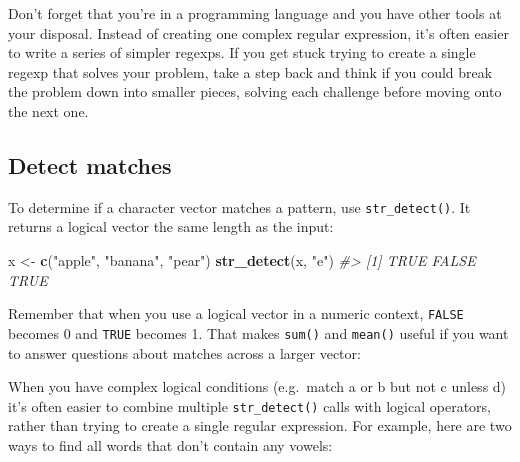 \documentclass[]{book}
\newenvironment{Shaded}{\begin{snugshade}}{\end{snugshade}}
\newcommand{\KeywordTok}[1]{\textcolor[rgb]{0.13,0.29,0.53}{\textbf{{#1}}}}
\newcommand{\StringTok}[1]{\textcolor[rgb]{0.31,0.60,0.02}{{#1}}}
\newcommand{\CommentTok}[1]{\textcolor[rgb]{0.56,0.35,0.01}{\textit{{#1}}}}
\newcommand{\NormalTok}[1]{{#1}}
\begin{document}
Don't forget that you're in a programming language and you have other
tools at your disposal. Instead of creating one complex regular
expression, it's often easier to write a series of simpler regexps. If
you get stuck trying to create a single regexp that solves your problem,
take a step back and think if you could break the problem down into
smaller pieces, solving each challenge before moving onto the next one.

\subsection{Detect matches}\label{detect-matches}

To determine if a character vector matches a pattern, use
\texttt{str\_detect()}. It returns a logical vector the same length as
the input:

\begin{Shaded}
\begin{Highlighting}[]
\NormalTok{x <-}\StringTok{ }\KeywordTok{c}\NormalTok{(}\StringTok{"apple"}\NormalTok{, }\StringTok{"banana"}\NormalTok{, }\StringTok{"pear"}\NormalTok{)}
\KeywordTok{str_detect}\NormalTok{(x, }\StringTok{"e"}\NormalTok{)}
\CommentTok{#> [1]  TRUE FALSE  TRUE}
\end{Highlighting}
\end{Shaded}

Remember that when you use a logical vector in a numeric context,
\texttt{FALSE} becomes 0 and \texttt{TRUE} becomes 1. That makes
\texttt{sum()} and \texttt{mean()} useful if you want to answer
questions about matches across a larger vector:

\begin{Shaded}
\end{Shaded}

When you have complex logical conditions (e.g.~match a or b but not c
unless d) it's often easier to combine multiple \texttt{str\_detect()}
calls with logical operators, rather than trying to create a single
regular expression. For example, here are two ways to find all words
that don't contain any vowels:
\end{document}
